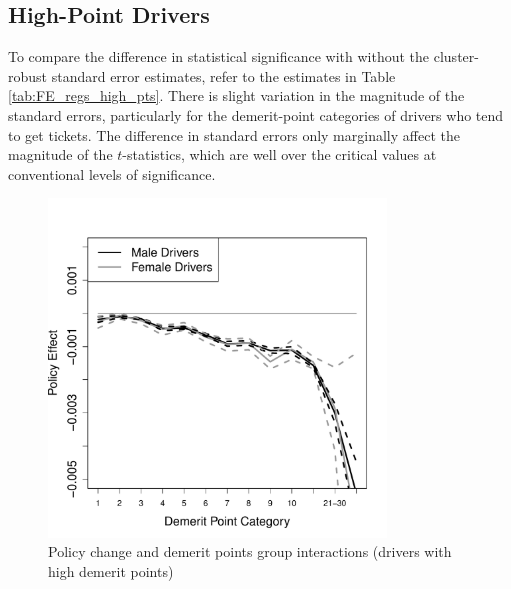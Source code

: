 \documentclass[12pt]{paper}
\begin{document}
\clearpage
\pagebreak
\subsection*{High-Point Drivers}











To compare the difference in statistical significance with without the cluster-robust standard error estimates, 
refer to the estimates in Table \ref{tab:FE_regs_high_pts}. 
There is slight variation in the magnitude of the standard errors, 
particularly for the demerit-point categories of drivers who tend to get tickets. 
The difference in standard errors only marginally affect the magnitude of the $t$-statistics, 
which are well over the critical values at conventional levels of significance. 





\begin{figure}
\centering
\includegraphics[width=0.8\textwidth]{../Figures/FFX_reg_policy_points_grp_high_pts.pdf}
\caption{Policy change and demerit points group interactions (drivers with high demerit points)}
% 
\label{fig:FE-regs}
\end{figure}
\end{document}
